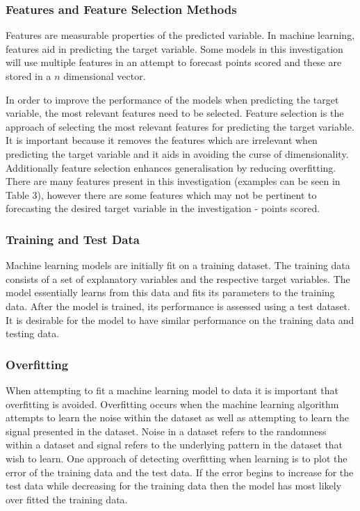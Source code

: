 \documentclass[a4paper,11pt,twoside]{article}
\begin{document}
\subsubsection{Features and Feature Selection Methods}
Features are measurable properties of the predicted variable. In machine learning, features aid in predicting the target variable. Some models in this investigation will use multiple features in an attempt to forecast points scored and these are stored in a $n$ dimensional vector.

In order to improve the performance of the models when predicting the target variable, the most relevant features need to be selected. Feature selection is the approach of selecting the most relevant features for predicting the target variable. It is important because it removes the features which are irrelevant when predicting the target variable and it aids in avoiding the curse of dimensionality. Additionally feature selection enhances generalisation by reducing overfitting. There are many features present in this investigation (examples can be seen in Table 3), however there are some features which may not be pertinent to forecasting the desired target variable in the investigation - points scored.

 \subsubsection{Training and Test Data}
Machine learning models are initially fit on a training dataset. The training data consists of a set of explanatory variables and the respective target variables. The model essentially learns from this data and fits its parameters to the training data. After the model is trained, its performance is assessed using a test dataset. It is desirable for the model to have similar performance on the training data and testing data.

\subsubsection{Overfitting}
When attempting to fit a machine learning model to data it is important that overfitting is avoided. Overfitting occurs when the machine learning algorithm attempts to learn the noise within the dataset as well as attempting to learn the signal presented in the dataset. Noise in a dataset refers to the randomness within a dataset and signal refers to the underlying pattern in the dataset that wish to learn. One approach of detecting overfitting when learning is to plot the error of the training data and the test data. If the error begins to increase for the test data while decreasing for the training data then the model has most likely over fitted the training data. 
\end{document}
